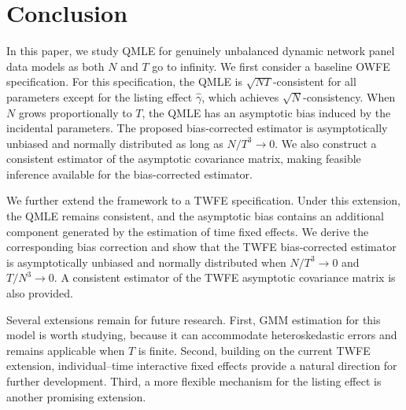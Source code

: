\documentclass[11pt,a4paper]{article}
\begin{document}
\section{Conclusion}\label{section6}
In this paper, we study QMLE for genuinely unbalanced dynamic network panel data models as both $N$ and $T$ go to infinity. We first consider a baseline OWFE specification. For this specification, the QMLE is $\sqrt{NT}$-consistent for all parameters except for the listing effect $\hat{\gamma}$, which achieves $\sqrt{N}$-consistency. When $N$ grows proportionally to $T$, the QMLE has an asymptotic bias induced by the incidental parameters. The proposed bias-corrected estimator is asymptotically unbiased and normally distributed as long as $N/T^3 \to 0$. We also construct a consistent estimator of the asymptotic covariance matrix, making feasible inference available for the bias-corrected estimator.

We further extend the framework to a TWFE specification. Under this extension, the QMLE remains consistent, and the asymptotic bias contains an additional component generated by the estimation of time fixed effects. We derive the corresponding bias correction and show that the TWFE bias-corrected estimator is asymptotically unbiased and normally distributed when $N/T^3 \to 0$ and $T/N^3 \to 0$. A consistent estimator of the TWFE asymptotic covariance matrix is also provided.

Several extensions remain for future research. First, GMM estimation for this model is worth studying, because it can accommodate heteroskedastic errors and remains applicable when $T$ is finite. Second, building on the current TWFE extension, individual--time interactive fixed effects provide a natural direction for further development. Third, a more flexible mechanism for the listing effect is another promising extension.

\end{document}
